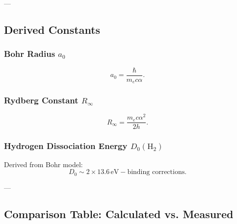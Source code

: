 \documentclass[12pt]{article}
\begin{document}
---

\subsection{Derived Constants}

\subsubsection{Bohr Radius \( a_0 \)}

\[
a_0 = \frac{\hbar}{m_e c \alpha}.
\]

\subsubsection{Rydberg Constant \( R_\infty \)}

\[
R_\infty = \frac{m_e c \alpha^2}{2h}.
\]

\subsubsection{Hydrogen Dissociation Energy \( D_0(\text{H}_2) \)}

Derived from Bohr model:
\[
D_0 \sim 2 \times 13.6 \, \text{eV} - \text{binding corrections}.
\]

---

\subsection{Comparison Table: Calculated vs. Measured}
\end{document}
